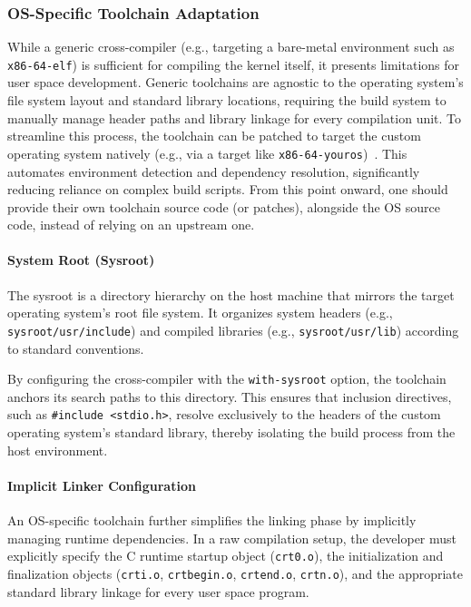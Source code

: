 \documentclass[a4paper,10pt,twoside]{report}
\theoremstyle{definition}
\begin{document}
\subsubsection{OS-Specific Toolchain Adaptation}
\label{subsubsec:os-specific-toolchain}

While a generic cross-compiler (e.g., targeting a bare-metal environment such as \texttt{x86-64-elf}) is sufficient for compiling the kernel itself, it presents limitations for user space development. Generic toolchains are agnostic to the operating system's file system layout and standard library locations, requiring the build system to manually manage header paths and library linkage for every compilation unit. To streamline this process, the toolchain can be patched to target the custom operating system natively  (e.g., via a target like \texttt{x86-64-youros})~\cite{osdev-os-specific-toolchain}. This automates environment detection and dependency resolution, significantly reducing reliance on complex build scripts. From this point onward, one should provide their own toolchain source code (or patches), alongside the OS source code, instead of relying on an upstream one.

\paragraph{System Root (Sysroot)}

The sysroot is a directory hierarchy on the host machine that mirrors the target operating system's root file system. It organizes system headers (e.g., \texttt{sysroot/usr/include}) and compiled libraries (e.g., \texttt{sysroot/usr/lib}) according to standard conventions.

By configuring the cross-compiler with the \texttt{\text{-}\text{-}with-sysroot} option, the toolchain anchors its search paths to this directory. This ensures that inclusion directives, such as \texttt{\#include <stdio.h>}, resolve exclusively to the headers of the custom operating system's standard library, thereby isolating the build process from the host environment.

\paragraph{Implicit Linker Configuration}

An OS-specific toolchain further simplifies the linking phase by implicitly managing runtime dependencies. In a raw compilation setup, the developer must explicitly specify the C runtime startup object (\texttt{crt0.o}), the initialization and finalization objects (\texttt{crti.o}, \texttt{crtbegin.o}, \texttt{crtend.o}, \texttt{crtn.o}), and the appropriate standard library linkage for every user space program.
\end{document}
